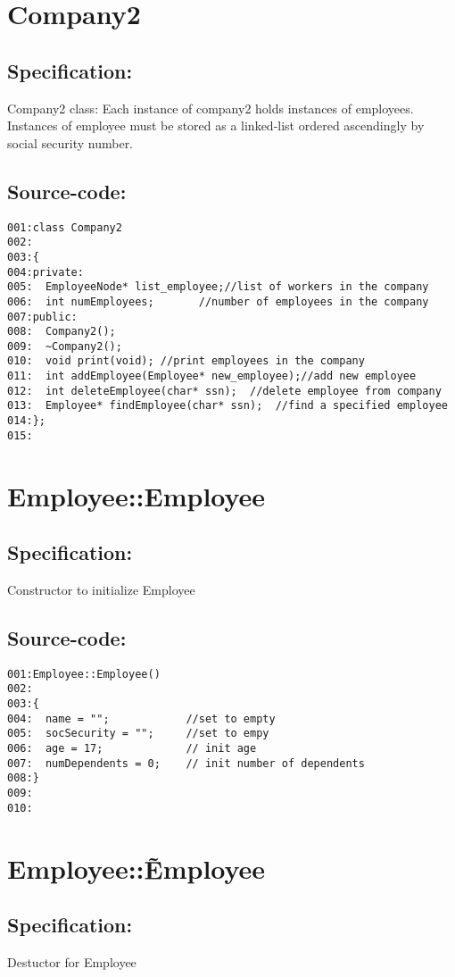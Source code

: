 \section{Company2}
\subsection*{Specification:}
Company2 class: Each instance of company2 holds instances of employees.
Instances of employee must be stored as a linked-list ordered ascendingly by
social security number.
\subsection*{Source-code:}
\begin{verbatim}
001:class Company2
002:
003:{ 
004:private:
005:  EmployeeNode* list_employee;//list of workers in the company
006:  int numEmployees;       //number of employees in the company    
007:public:
008:  Company2();
009:  ~Company2();
010:  void print(void); //print employees in the company
011:  int addEmployee(Employee* new_employee);//add new employee
012:  int deleteEmployee(char* ssn);  //delete employee from company
013:  Employee* findEmployee(char* ssn);  //find a specified employee
014:};
015:
\end{verbatim}
\section{Employee::Employee}
\subsection*{Specification:}
Constructor to initialize Employee
\subsection*{Source-code:}
\begin{verbatim}
001:Employee::Employee()
002:
003:{
004:  name = "";            //set to empty
005:  socSecurity = "";     //set to empy
006:  age = 17;             // init age
007:  numDependents = 0;    // init number of dependents
008:}
009:
010:
\end{verbatim}
\section{Employee::\~Employee}
\subsection*{Specification:}
Destuctor for Employee
